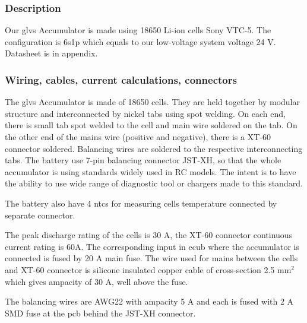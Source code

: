 \subsubsection{Description}
Our \gls{glvs} Accumulator is made using 18650 Li-ion cells Sony VTC-5. The configuration is 6s1p which equals to our low-voltage system voltage 24 V. Datasheet is in appendix.

\subsubsection{Wiring, cables, current calculations, connectors}

The \gls{glvs} Accumulator is made of 18650 cells. They are held together by modular structure and interconnected by nickel tabs using spot welding. On each end, there is small tab spot welded to the cell and main wire soldered on the tab. On the other end of the mains wire (positive and negative), there is a XT-60 connector soldered. Balancing wires are soldered to the respective interconnecting tabs. The battery use 7-pin balancing connector JST-XH, so that the whole accumulator is using standards widely used in RC models. The intent is to have the ability to use wide range of diagnostic tool or chargers made to this standard.

The battery also have 4 \glspl{ntc} for measuring cells temperature connected by separate connector.

The peak discharge rating of the cells is 30 A, the XT-60 connector continuous current rating is 60A. The corresponding input in \gls{ecub} where the accumulator is connected is fused by 20 A main fuse. The wire used for mains between the cells and XT-60 connector is silicone insulated copper cable of cross-section 2.5 mm$^2$ which gives ampacity of 30 A, well above the fuse.

The balancing wires are AWG22 with ampacity 5 A and each is fused with 2 A SMD fuse at the \gls{pcb} behind the JST-XH connector.

